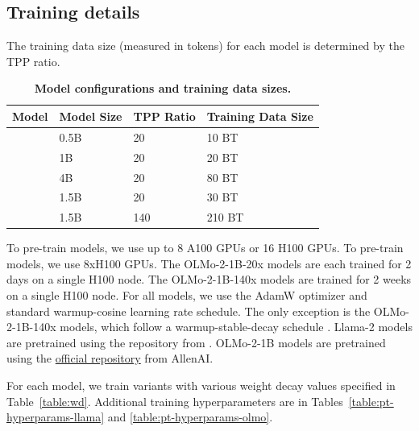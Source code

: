 \subsection{Training details}
\label{app:pt-training-details}

The training data size (measured in tokens) for each model is determined by the TPP ratio.

\renewcommand{\arraystretch}{1.2} 
\begin{table}[H]
\centering
\begin{tabular}{llll}
\hline
\textbf{Model} & \textbf{Model Size} & \textbf{TPP Ratio} & \textbf{Training Data Size} \\ \hline
\llamazeropointfiveB{} & 0.5B & 20 & 10 BT              \\
\llamaoneB{} & 1B & 20 & 20 BT              \\
\llamafourB{} & 4B & 20 & 80 BT              \\
\olmoonex{} & 1.5B & 20 & 30 BT              \\
\olmosevenx{} & 1.5B & 140 & 210 BT             \\ \hline
\end{tabular}
\vspace{0.2cm}
\caption{\textbf{Model configurations and training data sizes.}}
\label{table:training-data-size}
\end{table}


To pre-train \llama{} models, we use up to 8 A100 GPUs or 16 H100 GPUs. To pre-train \olmo{} models, we use 8xH100 GPUs. The OLMo-2-1B-20x models are each trained for 2 days on a single H100 node. The OLMo-2-1B-140x models are trained for 2 weeks on a single H100 node. For all models, we use the AdamW optimizer and standard warmup-cosine learning rate schedule. The only exception is the OLMo-2-1B-140x models, which follow a warmup-stable-decay schedule \cite{hagele2024scaling}. Llama-2 models are pretrained using the repository from \citet{qi2025evolm}. OLMo-2-1B models are pretrained using the  \href{http://github.com/allenai/OLMo}{official repository} from AllenAI. 

For each model, we train variants with various weight decay values specified in Table~\ref{table:wd}. Additional training hyperparameters are in Tables~\ref{table:pt-hyperparams-llama} and \ref{table:pt-hyperparams-olmo}. 

